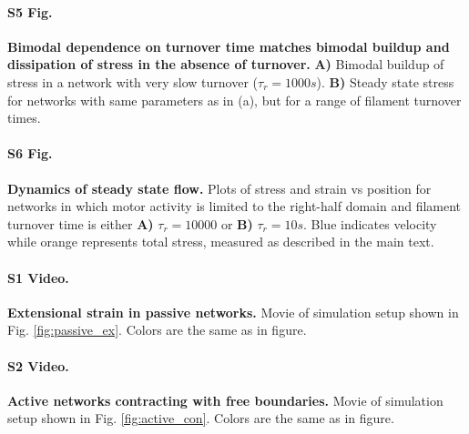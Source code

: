 \paragraph{S5 Fig.}
\label{fig:recycle_supp}
{\bf Bimodal dependence on turnover time matches bimodal buildup and dissipation of stress in the absence of turnover.}   \textbf{A)}  Bimodal buildup of stress in a network with very slow turnover ($\tau_r = 1000s$).  \textbf{B)}  Steady state stress for networks with same parameters as in (a), but  for a range of filament turnover times.   

\paragraph{S6 Fig.}
\label{fig:combo_prof}
{\bf  Dynamics of steady state flow.}  Plots of stress and strain vs position for networks in which motor activity is limited to the right-half domain and filament turnover time is either  \textbf{A)} $\tau_r = 10000$ or  \textbf{B)} $\tau_r = 10 s$.  Blue indicates velocity while orange represents total stress, measured as described in the main text. 


\paragraph{S1 Video.}
\label{passive_ex_video}
{\bf Extensional strain in passive networks.}  Movie of simulation setup shown in Fig. \ref{fig:passive_ex}.  Colors are the same as in figure.

\paragraph{S2 Video.}
\label{active_con_video}
{\bf Active networks contracting with free boundaries.}  Movie of simulation setup shown in Fig. \ref{fig:active_con}.  Colors are the same as in figure.